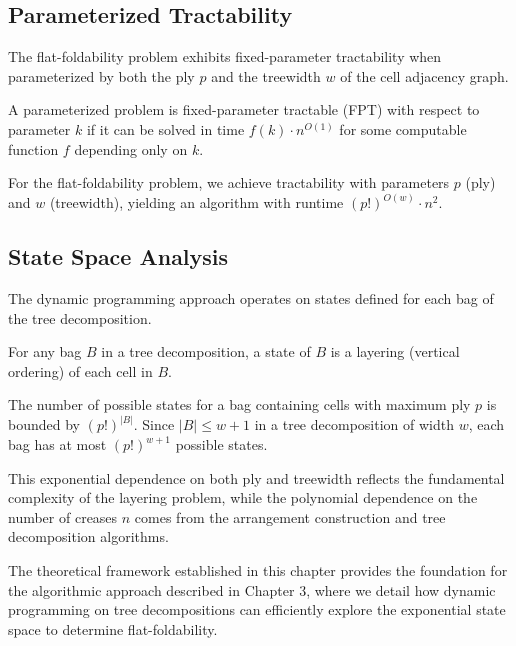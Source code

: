 \subsection{Parameterized Tractability}

The flat-foldability problem exhibits fixed-parameter tractability when parameterized by both the ply $p$ and the treewidth $w$ of the cell adjacency graph.

\begin{definition}
A parameterized problem is fixed-parameter tractable (FPT) with respect to parameter $k$ if it can be solved in time $f(k) \cdot n^{O(1)}$ for some computable function $f$ depending only on $k$.
\end{definition}

For the flat-foldability problem, we achieve tractability with parameters $p$ (ply) and $w$ (treewidth), yielding an algorithm with runtime $(p!)^{O(w)} \cdot n^2$.

\subsection{State Space Analysis}

The dynamic programming approach operates on states defined for each bag of the tree decomposition.

\begin{definition}
For any bag $B$ in a tree decomposition, a state of $B$ is a layering (vertical ordering) of each cell in $B$.
\end{definition}

The number of possible states for a bag containing cells with maximum ply $p$ is bounded by $(p!)^{|B|}$. Since $|B| \leq w + 1$ in a tree decomposition of width $w$, each bag has at most $(p!)^{w+1}$ possible states.

This exponential dependence on both ply and treewidth reflects the fundamental complexity of the layering problem, while the polynomial dependence on the number of creases $n$ comes from the arrangement construction and tree decomposition algorithms.

The theoretical framework established in this chapter provides the foundation for the algorithmic approach described in Chapter 3, where we detail how dynamic programming on tree decompositions can efficiently explore the exponential state space to determine flat-foldability.
